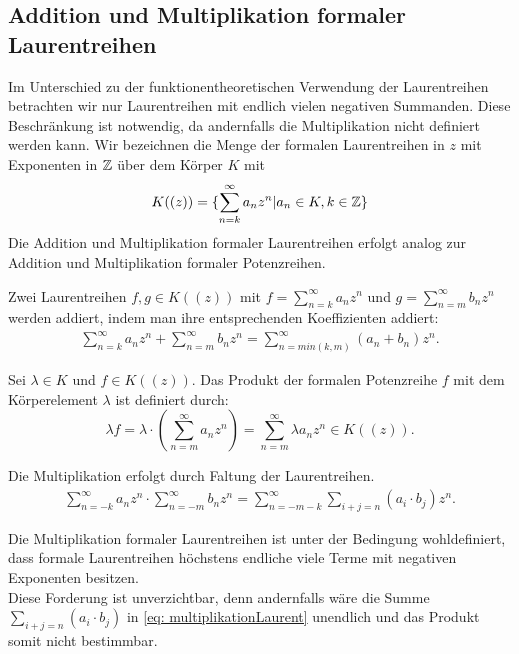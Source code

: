 \subsection{Addition und Multiplikation formaler Laurentreihen}\label{RechnenMitLaurentreihen}
%
%
Im Unterschied zu der funktionentheoretischen Verwendung der Laurentreihen betrachten wir nur Laurentreihen mit endlich vielen negativen Summanden. Diese Beschränkung ist notwendig, da andernfalls die Multiplikation nicht definiert werden kann.
Wir bezeichnen die Menge der formalen Laurentreihen in $z$ mit Exponenten in $\mathbb{Z}$ über dem Körper $K$ mit
\begin{equation*} %
K((z)) = \lbrace \sum_{n =k}^{\infty} a_nz^n \vert a_n \in K, k \in \Z\rbrace
\end{equation*} 
Die Addition und Multiplikation formaler Laurentreihen erfolgt analog zur Addition und Multiplikation formaler Potenzreihen.
\begin{defn}\label{AdditionLreihen}
Zwei Laurentreihen $f, g \in K((z))$ mit $f = \sum_{n=k}^\infty a_n z^n$ und $g= \sum_{n=m}^\infty b_n z^n$ werden addiert, indem man ihre entsprechenden Koeffizienten addiert: 
%
\begin{eqnarray}
\sum_{n=k}^\infty a_n z^n  +  \sum_{n=m}^\infty b_n z^n = \sum_{n = min(k, m)}^{\infty}(a_n + b_n) z^n.
\end{eqnarray}
\end{defn}
%
%
% 
%
\begin{defn}\label{MultiplikationKLreihen}
Sei $\lambda \in K$ und $f \in K\left(\left( z \right)\right)$. Das Produkt der formalen Potenzreihe $f$ mit dem Körperelement $\lambda$ ist definiert durch:
\[\lambda f = \lambda\cdot \left(\sum_{n=m}^{\infty}a_nz^n\right) = \sum_{n=m}^{\infty} \lambda a_nz^n \in K\left(\left( z\right)\right). 
\]
\end{defn}
%
%
%
\begin{defn}\label{MultiplikationLreihen}
Die Multiplikation erfolgt durch Faltung der Laurentreihen.
\begin{eqnarray}
\label{eq: multiplikationLaurent}
\sum_{n=-k}^{\infty} a_n z^n  \cdot  \sum_{n=-m}^{\infty} b_n z^n = \sum_{n = -m-k}^{\infty}\sum_{i+j=n}^{}\left(a_i \cdot b_j\right) z^n. 
\end{eqnarray}
%

\end{defn}
%
\begin{bem}
Die Multiplikation formaler Laurentreihen ist unter der Bedingung wohldefiniert, dass formale Laurentreihen höchstens endliche viele Terme mit negativen Exponenten besitzen. \\
Diese Forderung ist unverzichtbar, denn andernfalls wäre die Summe $\sum_{i+j=n}^{}\left(a_i \cdot b_j\right)$ in \ref{eq: multiplikationLaurent} unendlich und das Produkt somit nicht bestimmbar.
\end{bem}


